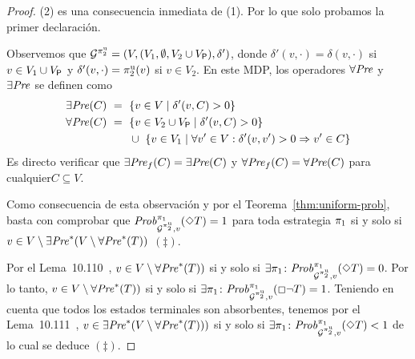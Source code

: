 \begin{proof}
  (2) es una consecuencia inmediata de (1). Por lo que solo probamos la primer declaración.

  Observemos que 
  $\mathcal{G}^{\pi^{\mathrm{u}}_{2}} = (V, (V_1, \emptyset, {V_2 \cup V_{\mathsf{P}}}), \delta')$,
  donde $\delta'(v,\cdot)=\delta(v,\cdot)$ si $v\in V_1\cup V_{\mathsf{P}}$
  y $\delta'(v,\cdot)=\pi^{\mathrm{u}}_{2}(v)$ si $v\in V_2$.
  En este MDP, los operadores $\forall\mathit{Pre}$ y $\exists\mathit{Pre}$ se definen como
  \begin{align*}
    \exists\mathit{Pre}(C) \ = \ {}&\{ v \in V \mid \delta'(v,C) > 0\} \\
    \forall\mathit{Pre}(C) \ = \ {}&\{ v \in V_2\cup V_{\mathsf{P}} \mid \delta'(v,C) > 0\} \\
		     &\cup \ \{ v \in  V_1 \mid \forall v' \in V : \delta'(v,v') > 0 \Rightarrow v' \in C \}
  \end{align*}
  Es directo verificar que $\exists\mathit{Pre}_f(C)=\exists\mathit{Pre}(C)$ y
  $\forall\mathit{Pre}_f(C)=\forall\mathit{Pre}(C)$ para cualquier$C\subseteq V$.

  Como consecuencia de esta observación y por el Teorema~\ref{thm:uniform-prob}, basta con comprobar que
  $\mathit{Prob}^{\pi_{1}}_{\mathcal{G}^{\pi^{\mathrm{u}}_{2}},v}(\Diamond T)=1$ para toda estrategia $\pi_{1}$ si y solo si
  $v \in V\setminus \exists\mathit{Pre}^*(V \setminus \forall\mathit{Pre}^*(T))$ $(\ddag)$.

  Por el Lema~10.110~\cite{BaierK08}, $v\in V \setminus \forall\mathit{Pre}^*(T))$ si y solo si
  $\exists \pi_{1}\colon \mathit{Prob}^{\pi_{1}}_{\mathcal{G}^{\pi^{\mathrm{u}}_{2}},v}(\Diamond T) = 0$.
  Por lo tanto, $v\in V \setminus \forall\mathit{Pre}^*(T))$ si y solo si
  $\exists \pi_{1}\colon \mathit{Prob}^{\pi_{1}}_{\mathcal{G}^{\pi^{\mathrm{u}}_{2}},v}(\Box \neg T) = 1$.
  Teniendo en cuenta que todos los estados terminales son absorbentes, tenemos por el Lema~10.111~\cite{BaierK08}, $v\in \exists\mathit{Pre}^*(V \setminus \forall\mathit{Pre}^*(T)))$ si y solo si
  $\exists \pi_{1}\colon \mathit{Prob}^{\pi_{1}}_{\mathcal{G}^{\pi^{\mathrm{u}}_{2}},v}(\Diamond T) < 1$
  de lo cual se deduce $(\ddag)$.
  \qedhere
\end{proof}





